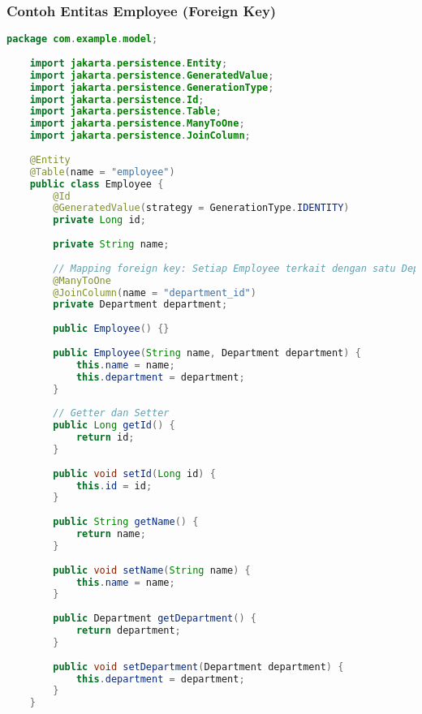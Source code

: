 \subsubsection*{Contoh Entitas Employee (Foreign Key)}
\begin{lstlisting}[language=Java, style=JavaStyle]
	package com.example.model;
	
	import jakarta.persistence.Entity;
	import jakarta.persistence.GeneratedValue;
	import jakarta.persistence.GenerationType;
	import jakarta.persistence.Id;
	import jakarta.persistence.Table;
	import jakarta.persistence.ManyToOne;
	import jakarta.persistence.JoinColumn;
	
	@Entity
	@Table(name = "employee")
	public class Employee {
		@Id
		@GeneratedValue(strategy = GenerationType.IDENTITY)
		private Long id;
		
		private String name;
		
		// Mapping foreign key: Setiap Employee terkait dengan satu Department
		@ManyToOne
		@JoinColumn(name = "department_id")
		private Department department;
		
		public Employee() {}
		
		public Employee(String name, Department department) {
			this.name = name;
			this.department = department;
		}
		
		// Getter dan Setter
		public Long getId() {
			return id;
		}
		
		public void setId(Long id) {
			this.id = id;
		}
		
		public String getName() {
			return name;
		}
		
		public void setName(String name) {
			this.name = name;
		}
		
		public Department getDepartment() {
			return department;
		}
		
		public void setDepartment(Department department) {
			this.department = department;
		}
	}
\end{lstlisting}


